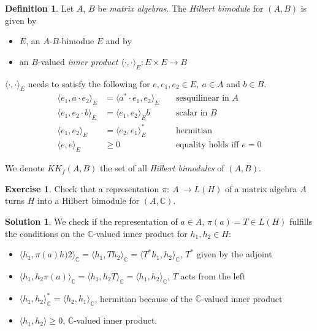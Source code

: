 \documentclass[a4paper]{article}
\theoremstyle{definition}
\newtheorem{definition}{Definition}
\theoremstyle{definition}
\theoremstyle{definition}
\theoremstyle{theorem}
\theoremstyle{theorem}
\newtheorem{exercise}{Exercise}
\theoremstyle{theorem}
\theoremstyle{definition}
\newtheorem{solution}{Solution}
\begin{document}
\begin{definition}
    Let $A$, $B$ be \textit{matrix algebras}. The \textit{Hilbert bimodule} for $(A, B)$ is given by
    \begin{itemize}
        \item $E$, an $A$-$B$-bimodue $E$ and by
        \item an $B$-valued \textit{inner product} $\langle \cdot,\cdot\rangle_E: E\times E \rightarrow B$
    \end{itemize}
$\langle \cdot,\cdot\rangle_E$ needs to satisfy the following for $e, e_1, e_2 \in E,\ a \in A$ and $b \in B$.
\begin{align*}
    \langle e_1, a\cdot e_2\rangle_E &= \langle a^*\cdot e_1, e_2\rangle_E \;\;\;\; & \text{sesquilinear in $A$}\\
    \langle e_1, e_2 \cdot b\rangle_E &= \langle e_1, e_2\rangle_E b \;\;\;\; & \text{scalar in $B$} \\
    \langle e_1, e_2\rangle_E &= \langle e_2,e_1\rangle^*_E \;\;\;\; & \text{hermitian} \\
    \langle e, e\rangle_E &\ge 0 \;\;\;\; & \text{equality holds iff $e=0$}
\end{align*}

\end{definition}

We denote $KK_f(A,B)$ the set of all \textit{Hilbert bimodules} of $(A,B)$.

\begin{exercise}
    Check that a representation $\pi:\ A \ \rightarrow L(H)$ of a matrix algebra $A$ turns $H$ into
    a Hilbert bimodule for $(A, \mathbb{C})$.
    \label{ex: bimodule}
\end{exercise}

\begin{solution}
    We check if the representation of $a \in A$, $\pi(a)=T \in L(H)$ fulfills
    the conditions on the $\mathbb{C}$-valued inner product for $h_1, h_2 \in H$:
    \begin{itemize}
        \item $\langle h_1, \pi(a) h)2\rangle _\mathbb{C} = \langle h_1, T h_2\rangle _\mathbb{C} =
            \langle T^* h_1, h_2\rangle _\mathbb{C}$, $T^*$ given by the adjoint
        \item $\langle h_1, h_2 \pi(a)\rangle _\mathbb{C} = \langle h_1, h_2 T\rangle _\mathbb{C} = \langle h_1, h_2\rangle _\mathbb{C}$, $T$ acts from the left
        \item $\langle h_1, h_2\rangle _\mathbb{C}^* = \langle h_2,h_1\rangle _\mathbb{C}$, hermitian because of the
            $\mathbb{C}$-valued inner product
        \item $\langle h_1, h_2\rangle  \ge 0$, $\mathbb{C}$-valued inner product.
    \end{itemize}
\end{solution}
\end{document}

